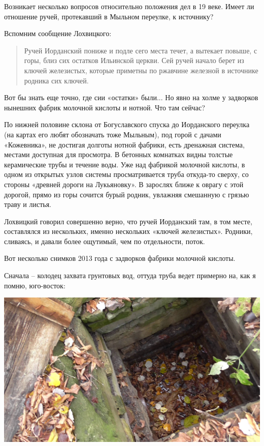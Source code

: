 Возникает несколько вопросов относительно положения дел в 19 веке. Имеет ли отношение ручей, протекавший в Мыльном переулке, к источнику?

Вспомним сообщение Лохвицкого: 

\begin{quotation}
Ручей Иорданский пониже и подле сего места течет, а вытекает повыше, с горы, близ сих остатков Ильинской церкви. Сей ручей начало берет из ключей железистых, которые приметны по ржавчине железной в источнике родника сих ключей.
\end{quotation}

Вот бы знать еще точно, где сии «остатки» были... Но явно на холме у задворков нынешних фабрик молочной кислоты и нотной. Что там сейчас?

По нижней половине склона от Богуславского спуска до Иорданского переулка (на картах его любят обозначать тоже Мыльным), под горой с дачами «Кожевника», не достигая долготы нотной фабрики, есть дренажная система, местами доступная для просмотра. В бетонных комнатках видны толстые керамические трубы и течение воды. Уже над фабрикой молочной кислоты, в одном из открытых узлов системы просматривается труба откуда-то сверху, со стороны «древней дороги на Лукьяновку». В зарослях ближе к оврагу с этой дорогой, прямо из горы сочится бурый родник, увлажняя смешанную с грязью траву и листья.

Лохвицкий говорил совершенно верно, что ручей Иорданский там, в том месте, составлялся из нескольких, именно нескольких «ключей железистых». Родники, сливаясь, и давали более ощутимый, чем по отдельности, поток.

Вот несколько снимков 2013 года с задворков фабрики молочной кислоты.

Сначала – колодец захвата грунтовых вод, оттуда труба ведет примерно на, как я помню, юго-восток:

\begin{center}
\includegraphics[width=\linewidth]{chast-kirvys/iordanruch/s_vlcsnap-2014-05-16-20h08m14s138.jpg}
\end{center}

